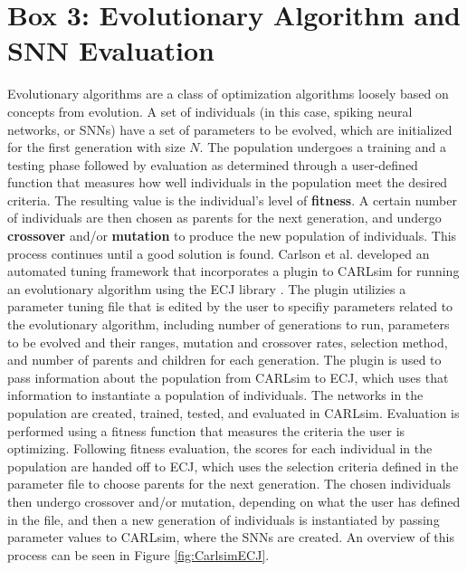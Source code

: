 \section{Box 3: Evolutionary Algorithm and SNN Evaluation}
\label{box:EA}
Evolutionary algorithms are a class of optimization algorithms loosely based on concepts from evolution. A set of individuals (in this case, spiking neural networks, or SNNs) have a set of parameters to be evolved, which are initialized for the first generation with size $N$. The population undergoes a training and a testing phase followed by evaluation as determined through a user-defined function that measures how well individuals in the population meet the desired criteria. The resulting value is the individual’s level of \textbf{fitness}. A certain number of individuals are then chosen as parents for the next generation, and undergo \textbf{crossover} and/or \textbf{mutation} to produce the new population of individuals. This process continues until a good solution is found.
Carlson et al. \citep{Carlson2014} developed an automated tuning framework that incorporates a plugin to CARLsim for running an evolutionary algorithm using the ECJ library \citep{white2012}. The plugin utilizies a parameter tuning file that is edited by the user to specifiy parameters related to the evolutionary algorithm, including number of generations to run, parameters to be evolved and their ranges, mutation and crossover rates, selection method, and number of parents and children for each generation. The plugin is used to pass information about the population from CARLsim to  ECJ, which uses that information to instantiate a population of individuals. The networks in the population are created, trained, tested, and evaluated in CARLsim. Evaluation is performed using a fitness function that measures the criteria the user is optimizing. Following fitness evaluation, the scores for each individual in the population are handed off to ECJ, which uses the selection criteria defined in the parameter file to choose parents for the next generation. The chosen individuals then undergo crossover and/or mutation, depending on what the user has defined in the file, and then a new generation of individuals is instantiated by passing parameter values to CARLsim, where the SNNs are created. An overview of this process can be seen in Figure \ref{fig:CarlsimECJ}.

